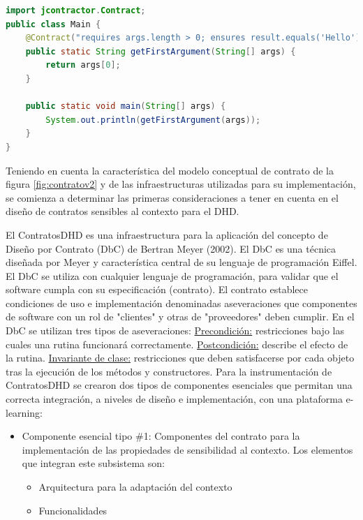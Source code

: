 \begin{itemize}
\begin{lstlisting}[language=Java]
import jcontractor.Contract;
public class Main {
    @Contract("requires args.length > 0; ensures result.equals('Hello');")
    public static String getFirstArgument(String[] args) {
        return args[0];
    }

    public static void main(String[] args) {
        System.out.println(getFirstArgument(args));
    }
}
\end{lstlisting}



Teniendo en cuenta la característica del modelo conceptual de contrato de la figura \ref{fig:contratov2} y de las infraestructuras utilizadas para su implementación, se comienza a determinar las primeras consideraciones a tener en cuenta en el diseño de contratos sensibles al contexto para el DHD.

\begin{defi} [ContratoDHD]

El ContratosDHD es una infraestructura para la aplicación del concepto de Diseño por Contrato (DbC) de Bertran Meyer (2002). El DbC es una técnica diseñada por Meyer y característica central de su lenguaje de programación Eiffel\cite{Meyer}. El DbC se utiliza con cualquier lenguaje de programación, para validar que el software cumpla con su especificación (contrato). El contrato establece condiciones de uso e implementación denominadas aseveraciones que componentes de software con un rol de "clientes" y otras de "proveedores" deben cumplir. En el DbC se utilizan tres tipos de aseveraciones: \underline{Precondición:} restricciones bajo las cuales una rutina funcionará correctamente.  \underline{Postcondición:} describe el efecto de la rutina. \underline{Invariante de clase:} restricciones que deben satisfacerse por cada objeto tras la ejecución de los métodos y constructores. 
Para la instrumentación de ContratosDHD se crearon dos tipos de componentes esenciales que permitan una correcta integración, a niveles de diseño e implementación, con una plataforma e-learning:

\begin{itemize} \label{CEC}

 \item Componente esencial tipo \#1: Componentes del contrato para la implementación de las
propiedades de sensibilidad al contexto. Los elementos que integran este
subsistema son:
 
      \begin{itemize}
       \item Arquitectura para la adaptación del contexto
       \item Funcionalidades 
      \end{itemize}
      

\end{itemize}
\end{defi}
\end{itemize}
